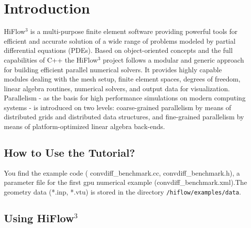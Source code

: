 \documentclass[a4paper, 11pt, twoside]{article}
\begin{document}
\thispagestyle{empty}




\newcommand{\dd}{\mathrm{d}}
\newtheorem{remark}{Remark}[section]
\thispagestyle{empty}
\tableofcontents

\newpage
\pagestyle{plain}
\vspace{0.5cm}
\section{Introduction}

HiFlow$^3$ is a multi-purpose finite element software providing powerful tools
for efficient and accurate solution of a wide range of problems modeled by
partial differential equations (PDEs). Based on object-oriented concepts and
the full capabilities of C++ the HiFlow$^3$ project follows a modular and
generic approach for building efficient parallel numerical solvers. It
provides highly capable modules dealing with the mesh setup, finite element
spaces, degrees of freedom, linear algebra routines, numerical solvers, and
output data for visualization. Parallelism - as the basis for high performance
simulations on modern computing systems - is introduced on two levels:
coarse-grained parallelism by means of distributed grids and distributed data
structures, and fine-grained parallelism by means of platform-optimized linear
algebra back-ends. 

\subsection{How to Use the Tutorial?}
You find the example code ( convdiff\_benchmark.cc,  convdiff\_benchmark.h), a
parameter file for the first gpu numerical example
(convdiff\_benchmark.xml).The geometry data (*.inp, *.vtu) is stored in the
directory \verb'/hiflow/examples/data'. 

\subsection{Using HiFlow$^3$}
\end{document}
